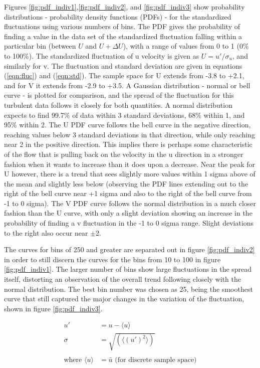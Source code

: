 \documentclass[conf]{new-aiaa}
\begin{document}
Figures \ref{fig:pdf_indiv1},\ref{fig:pdf_indiv2}, and \ref{fig:pdf_indiv3} show probability distributions - probability density functions (PDFs) - for the standardized fluctuations using various numbers of bins.  The PDF gives the probability of finding a value in the data set of the standardized fluctuation falling within a particular bin (between $U$ and $U + \Delta U$), with a range of values from 0 to 1 (0\% to 100\%).  The standardized fluctuation of u velocity is given as $U = u'/\sigma_u$, and similarly for v.  The fluctuation and standard deviation are given in equations (\ref{eqn:fluc}) and (\ref{eqn:std}).  The sample space for U extends from -3.8 to +2.1, and for V it extends from -2.9 to +3.5.  A Gaussian distribution - normal or bell curve - is plotted for comparison, and the spread of the fluctuation for this turbulent data follows it closely for both quantities.  A normal distribution expects to find 99.7\% of data within 3 standard deviations, 68\% within 1, and 95\% within 2.  The U PDF curve follows the bell curve in the negative direction, reaching values below 3 standard deviations in that direction, while only reaching near 2 in the positive direction.  This implies there is perhaps some characteristic of the flow that is pulling back on the velocity in the u direction in a stronger fashion when it wants to increase than it does upon a decrease.  Near the peak for U however, there is a trend that sees slightly more values within 1 sigma above of the mean and slightly less below (observing the PDF lines extending out to the right of the bell curve near +1 sigma and also to the right of the bell curve from -1 to 0 sigma).  The V PDF curve follows the normal distribution in a much closer fashion than the U curve, with only a slight deviation showing an increase in the probability of finding a v fluctuation in the -1 to 0 sigma range.  Slight deviations to the right also occur near $\pm$2.

The curves for bins of 250 and greater are separated out in figure \ref{fig:pdf_indiv2} in order to still discern the curves for the bins from 10 to 100 in figure \ref{fig:pdf_indiv1}.  The larger number of bins show large fluctuations in the spread itself, distorting an observation of the overall trend following closely with the normal distribution.  The best bin number was chosen as 25, being the smoothest curve that still captured the major changes in the variation of the fluctuation, shown in figure \ref{fig:pdf_indiv3}.

\begin{align} 
	u' &= u - \langle u \rangle \label{eqn:fluc} \\
	\sigma &= \sqrt{(\langle (u')^2 \rangle)} \label{eqn:std} \\ \nonumber\\
	\text{where\ \ \ \ }
	\langle u \rangle &= \bar{u} \text{ (for discrete sample space)} \nonumber
\end{align}
\end{document}

